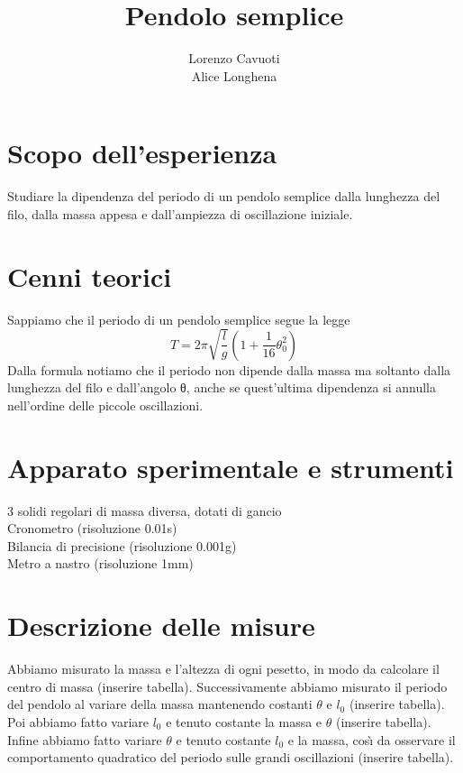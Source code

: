 \documentclass{article}
\title{Pendolo semplice}
\author{Lorenzo Cavuoti \\ Alice Longhena}
\begin{document}
	\maketitle
	
	\section{Scopo dell'esperienza}
		Studiare la dipendenza del periodo di un pendolo semplice dalla lunghezza del filo, dalla massa appesa e dall'ampiezza di oscillazione iniziale.

	\section{Cenni teorici}
		Sappiamo che il periodo di un pendolo semplice segue la legge
		\begin{equation}
			T = 2\pi \sqrt{\frac{l}{g}}(1+\frac{1}{16}\theta_0^2)
			\label{periodo pendolo}
		\end{equation}
		Dalla formula notiamo che il periodo non dipende dalla massa ma soltanto dalla lunghezza del filo e dall'angolo θ, anche se quest'ultima dipendenza si annulla nell'ordine delle piccole oscillazioni.

	\section{Apparato sperimentale e strumenti}
		3 solidi regolari di massa diversa, dotati di gancio\\
		Cronometro (risoluzione 0.01s)\\
		Bilancia di precisione (risoluzione 0.001g)\\
		Metro a nastro (risoluzione 1mm)\\
	
	\section{Descrizione delle misure}
		Abbiamo misurato la massa e l'altezza di ogni pesetto, in modo da calcolare il centro di massa (inserire tabella). Successivamente abbiamo misurato il periodo del pendolo al variare della massa mantenendo costanti $\theta$ e $l_0$ (inserire tabella). Poi abbiamo fatto variare $l_0$ e tenuto costante la massa e $\theta$ (inserire tabella). Infine abbiamo fatto variare $\theta$ e tenuto costante $l_0$ e la massa, cos\`{\i} da osservare il comportamento quadratico del periodo sulle grandi oscillazioni (inserire tabella).
	
\end{document}
